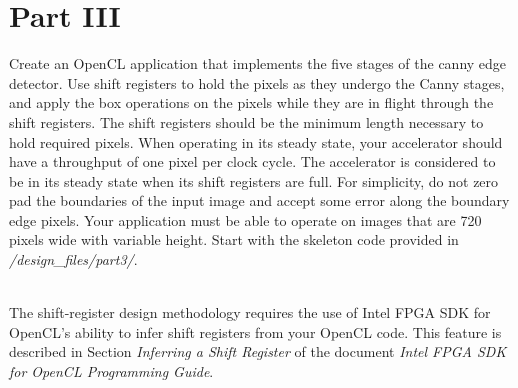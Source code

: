 \documentclass[epsfig,10pt,fullpage]{article}
\newcommand{\CommonDocsPath}{../../common/docs}
\begin{document}
\section*{Part III}

Create an OpenCL application that implements the five stages of the canny edge detector.
Use shift registers to hold the pixels as they undergo the Canny stages, and apply the box operations on the pixels
while they are in flight through the shift registers. The shift registers should be the minimum length necessary to hold
required pixels.
When operating in its steady state, your accelerator should have a throughput of one pixel per clock cycle.
The accelerator is considered to be in its steady state when its shift registers are full. 
For simplicity, do not zero pad the boundaries of the input image and accept some error along the boundary edge pixels.
Your application must be able to operate on images that are 720 pixels wide with variable height.
Start with the skeleton code provided in \textit{/design\_files/part3/}.

~\\
The shift-register design methodology requires the use of Intel FPGA SDK for OpenCL's ability to infer shift registers from 
your OpenCL code. This feature is described in Section \textit{Inferring a Shift Register} of the document \textit{Intel FPGA SDK for OpenCL Programming Guide}.



\end{document}
